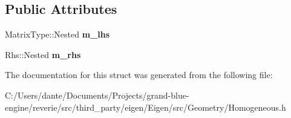 \subsection*{Public Attributes}
\begin{DoxyCompactItemize}
\item 
\mbox{\label{struct_eigen_1_1internal_1_1homogeneous__right__product__impl_3_01_homogeneous_3_01_matrix_type_ef182dac64ca84d6bf223cfad456dbfc_aff928a258b6821f8366504e9b9492b7f}} 
Matrix\+Type\+::\+Nested {\bfseries m\+\_\+lhs}
\item 
\mbox{\label{struct_eigen_1_1internal_1_1homogeneous__right__product__impl_3_01_homogeneous_3_01_matrix_type_ef182dac64ca84d6bf223cfad456dbfc_a298ef9c36d79981d066125b8e5741e29}} 
Rhs\+::\+Nested {\bfseries m\+\_\+rhs}
\end{DoxyCompactItemize}


The documentation for this struct was generated from the following file\+:\begin{DoxyCompactItemize}
\item 
C\+:/\+Users/dante/\+Documents/\+Projects/grand-\/blue-\/engine/reverie/src/third\+\_\+party/eigen/\+Eigen/src/\+Geometry/Homogeneous.\+h\end{DoxyCompactItemize}

